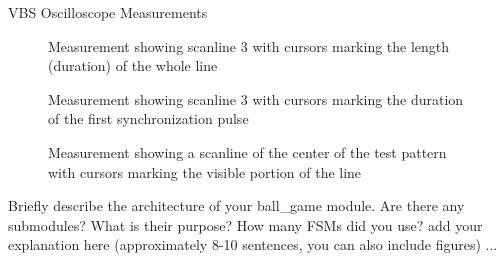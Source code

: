 \documentclass[10pt,a4paper,titlepage,oneside]{article}
\begin{document}
\maketitle



\begin{qa}{VBS Oscilloscope Measurements}

	\begin{figure}[h!]
		\centering
		\dummyimage
		\caption{Measurement showing scanline 3 with cursors marking the length (duration) of the whole line}
	\end{figure}
	
	\begin{figure}[h!]
		\centering
		\dummyimage
		\caption{Measurement showing scanline 3 with cursors marking the duration of the first synchronization pulse}
	\end{figure}
	
	\begin{figure}[h!]
		\centering
		\dummyimage
		\caption{Measurement showing a scanline of the center of the test pattern with cursors marking the visible portion of the line}
	\end{figure}

\end{qa}



\begin{qa}{Briefly describe the architecture of your \textsf{ball\_game} module. Are there any submodules? What is their purpose? How many FSMs did you use?}
add your explanation here (approximately 8-10 sentences, you can also include figures) ... 
\end{qa}
\end{document}
